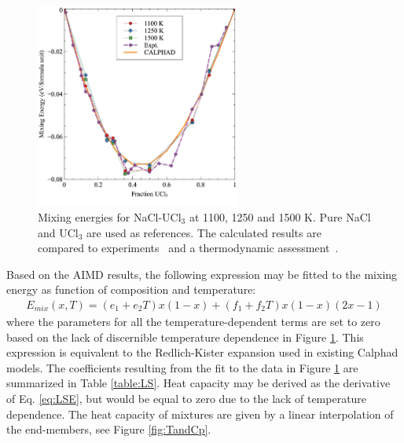 \documentclass[preprint,3p,10pt,onecolumn,number,sort&compress]{elsarticle}
\begin{document}
{\begin{figure}[htb]
\centering
\includegraphics[width=0.6\textwidth]{fig9.jpg}
\caption{Mixing energies for NaCl-UCl$_3$ at 1100, 1250 and 1500 K. Pure NaCl and UCl$_3$ are used as references. The calculated results are compared to experiments~\cite{Matsuura} and a thermodynamic assessment~\cite{YIN2020}.%
} 
\label{fig:mixing}
\end{figure}

Based on the AIMD results, the following expression may be fitted to the mixing energy as function of composition and temperature:
\begin{equation}
\begin{split}
E_{mix}(x,T)=(e_1+e_2T)x(1-x)+(f_1+f_2T)x(1-x)(2x-1) %
\label{eq:LSE}
\end{split}
\end{equation}
where the parameters for all the temperature-dependent terms are set to zero based on the lack of discernible temperature dependence in Figure \ref{fig:mixing}. This expression is equivalent to the Redlich-Kister expansion used in existing Calphad models. The coefficients resulting from the fit to the data in Figure \ref{fig:mixing} are summarized in Table \ref{table:LS}. Heat capacity may be derived as the derivative of Eq. \ref{eq:LSE}, but would be equal to zero due to the lack of temperature dependence. The heat capacity of mixtures are given by a linear interpolation of the end-members, see Figure \ref{fig:TandCp}.

}
\end{document}
